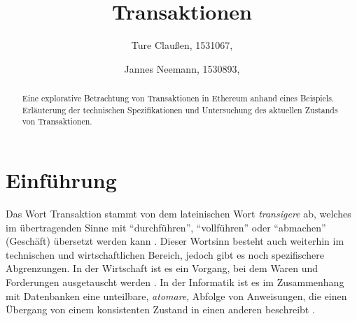 \documentclass[runningheads]{llncs}
\begin{document}
\title{Transaktionen}
\author{Ture Claußen, 1531067,  \and Jannes Neemann, 1530893, }
{\def\addcontentsline#1#2#3{}\maketitle} %


\begin{abstract}
  Eine explorative Betrachtung von Transaktionen in Ethereum anhand eines Beispiels. Erläuterung der technischen Spezifikationen und Untersuchung des aktuellen Zustands von Transaktionen.

\end{abstract}

\section{Einführung}
Das Wort Transaktion stammt von dem lateinischen Wort \textit{transigere} ab, welches im übertragenden Sinne mit "`durchführen"', "`vollführen"' oder "`abmachen"' (Geschäft) übersetzt werden kann \cite{noauthor_transigere_nodate}. Dieser Wortsinn besteht auch weiterhin im technischen und wirtschaftlichen Bereich, jedoch gibt es noch spezifischere Abgrenzungen. In der Wirtschaft ist es ein Vorgang, bei dem Waren und Forderungen ausgetauscht werden \cite[S. 18 f.]{ehrlicher_kompendium_1975}.  In der Informatik ist es im Zusammenhang mit Datenbanken eine unteilbare, \textit{atomare}, Abfolge von Anweisungen, die einen Übergang von einem konsistenten Zustand in einen anderen beschreibt \cite[S.520]{herold_grundlagen_2017}. 
\end{document}
